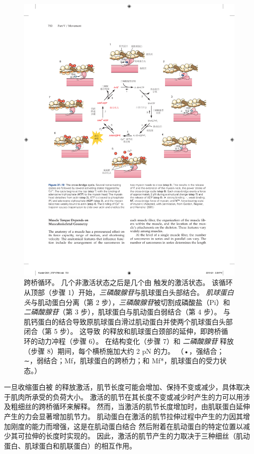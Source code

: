 \begin{figure}[htbp]
	\centering
	\includegraphics[width=1.0\linewidth]{chap31/fig_31_10}
	\caption{跨桥循环。
	几个非激活状态之后是几个由  触发的激活状态。
	该循环从顶部（步骤 1）开始，\textit{三磷酸腺苷}与肌球蛋白头部结合。
	\textit{肌球蛋白头}与肌动蛋白分离（第 2 步），\textit{三磷酸腺苷}被切割成磷酸盐（Pi）和\textit{二磷酸腺苷}（第 3 步），肌球蛋白与肌动蛋白弱结合（第 4 步）。
	  与肌钙蛋白的结合导致原肌球蛋白滑过肌动蛋白并使两个肌球蛋白头部闭合（第 5 步）。
	这导致  的释放和肌球蛋白颈部的延伸，即跨桥循环的动力冲程（步骤 6）。
	在结构变化（步骤 7）和 \textit{二磷酸腺苷} 释放（步骤 8）期间，每个横桥施加大约 2 pN 的力。 （•，强结合；∼，弱结合；Mf，肌球蛋白的跨桥力；和 Mf*，肌球蛋白的受力状态。）\cite{gordon2001skeletal} }
	\label{fig:31_10}
\end{figure}


一旦收缩蛋白被  的释放激活，肌节长度可能会增加、保持不变或减少，具体取决于肌肉所承受的负荷大小。
激活的肌节在其长度不变或减少时产生的力可以用涉及粗细丝的跨桥循环来解释。
然而，当激活的肌节长度增加时，由肌联蛋白延伸产生的力会显著增加肌节力。
肌动蛋白在激活的肌节拉伸过程中产生的力因其增加刚度的能力而增强，这是在肌动蛋白结合  然后附着在肌动蛋白的特定位置以减少其可拉伸的长度时实现的。
因此，激活的肌节产生的力取决于三种细丝（肌动蛋白、肌球蛋白和肌联蛋白）的相互作用。



